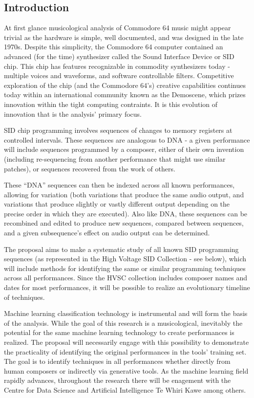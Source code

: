 \documentclass[10pt]{article}
\begin{document}
        \vspace{5mm}

\begin{multicols*}{2}

  \section{Introduction}
  At first glance musicological analysis of Commodore 64 music might
  appear trivial as the hardware is simple, well documented, and was
  designed in the late 1970s. Despite this simplicity, the
  Commodore 64 computer contained an advanced (for the time) synthesizer
  called the Sound Interface Device or SID chip. This chip has features
  recognizable in commodity synthesizers today - multiple voices and
  waveforms, and software controllable filters. Competitive
  exploration of the chip (and the Commodore 64's) creative capabilities
  continues today within an international community known as the Demoscene,
  which prizes innovation within the tight computing contraints. It is this
  evolution of innovation that is the analysis' primary focus.

  SID chip programming involves sequences of changes to memory
  registers at controlled intervals. These sequences are analogous to
  DNA - a given performance will include sequences programmed by a
  composer, either of their own invention (including re-sequencing
  from another performance that might use similar patches), or
  sequences recovered from the work of others.

  These ``DNA'' sequences can then be indexed across all known
  performances, allowing for variation (both variations that produce
  the same audio output, and variations that produce slightly or
  vastly different output depending on the precise order in which they
  are executed). Also like DNA, these sequences can be recombined and
  edited to produce new sequences, compared between sequences, and a
  given subsequence's effect on audio output can be determined.

  The proposal aims to make a systematic study of all known SID
  programming sequences (as represented in the High Voltage SID
  Collection - see below), which will include methods for identifying
  the same or similar programming techniques across all
  performances. Since the HVSC collection includes composer names and dates
  for most performances, it will be possible to realize an
  evolutionary timeline of techniques.

  Machine learning classification technology is instrumental and will
  form the basis of the analysis. While the goal of this research is a
  musicological, inevitably the potential for the same machine
  learning technology to create performances is realized. The proposal
  will necessarily engage with this possibility to demonstrate the
  practicality of identifying the original performances in the tools'
  training set. The goal is to identify techniques in all performances
  whether directly from human composers or indirectly via generative
  tools.  As the machine learning field rapidly advances, throughout
  the research there will be enagement with the Centre for Data
  Science and Artificial Intelligence Te Whiri Kawe among others.


\end{multicols*}
\end{document}
